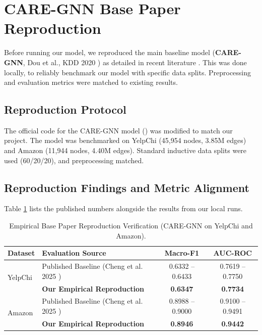 \section[CARE-GNN Base Paper Reproduction]{CARE-GNN Base Paper Reproduction}
\label{sec:reproduction_results}
\label{sec:care_gnn_reproduction}

Before running our model, we reproduced the main baseline model (\textbf{CARE-GNN}, Dou et al., KDD 2020 \cite{dou2020enhancing}) as detailed in recent literature \cite{cheng2025financial}. This was done locally, to reliably benchmark our model with specific data splits. Preprocessing and evaluation metrics were matched to existing results.

\subsection{Reproduction Protocol}
The official code for the CARE-GNN model () was modified to match our project. The model was benchmarked on YelpChi (45,954 nodes, 3.85M edges) and Amazon (11,944 nodes, 4.40M edges). Standard inductive data splits were used (60/20/20), and preprocessing matched.

\subsection{Reproduction Findings and Metric Alignment}
Table \ref{tab:care_reproduction} lists the published numbers alongside the results from our local runs.

\begin{table}[htbp]
\centering
\caption[Empirical Base Paper Reproduction Verification]{Empirical Base Paper Reproduction Verification (CARE-GNN on YelpChi and Amazon).}
\label{tab:care_reproduction}
\begin{tabularx}{\textwidth}{@{}l >{\raggedright\arraybackslash}X cc@{}}
\toprule
\textbf{Dataset} & \textbf{Evaluation Source} & \textbf{Macro-F1} & \textbf{AUC-ROC} \\ \midrule
\multirow{2}{*}{YelpChi} & Published Baseline (Cheng et al. 2025 \cite{cheng2025financial}) & 0.6332 -- 0.6433 & 0.7619 -- 0.7750 \\
 & \textbf{Our Empirical Reproduction} & \textbf{0.6347} & \textbf{0.7734} \\ \midrule
\multirow{2}{*}{Amazon} & Published Baseline (Cheng et al. 2025 \cite{cheng2025financial}) & 0.8988 -- 0.9000 & 0.9100 -- 0.9491 \\
 & \textbf{Our Empirical Reproduction} & \textbf{0.8946} & \textbf{0.9442} \\ \bottomrule
\end{tabularx}
\end{table}

